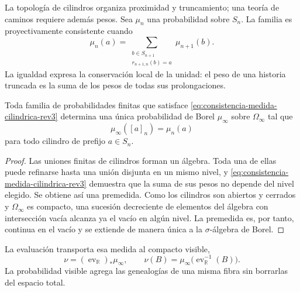 La topología de cilindros organiza proximidad y truncamiento; una teoría de
caminos requiere además pesos. Sea \(\mu_n\) una probabilidad sobre \(S_n\).
La familia es proyectivamente consistente cuando
\begin{equation}
 \mu_n(a)=
 \sum_{\substack{b\in S_{n+1}\\r_{n+1,n}(b)=a}}\mu_{n+1}(b).
 \label{eq:consistencia-medida-cilindrica-rev3}
\end{equation}
La igualdad expresa la conservación local de la unidad: el peso de una
historia truncada es la suma de los pesos de todas sus prolongaciones.

\begin{theorem}
\label{thm:medida-genealogica-limite-rev3}
Toda familia de probabilidades finitas que satisface
\eqref{eq:consistencia-medida-cilindrica-rev3} determina una única
probabilidad de Borel \(\mu_\infty\) sobre \(\Omega_\infty\) tal que
\begin{equation}
 \mu_\infty([a]_n)=\mu_n(a)
 \label{eq:medida-cilindro-rev3}
\end{equation}
para todo cilindro de prefijo \(a\in S_n\).
\end{theorem}

\begin{proof}
Las uniones finitas de cilindros forman un álgebra. Toda una de ellas puede
refinarse hasta una unión disjunta en un mismo nivel, y
\eqref{eq:consistencia-medida-cilindrica-rev3} demuestra que la suma de sus
pesos no depende del nivel elegido. Se obtiene así una premedida. Como los
cilindros son abiertos y cerrados y \(\Omega_\infty\) es compacto, una
sucesión decreciente de elementos del álgebra con intersección vacía alcanza
ya el vacío en algún nivel. La premedida es, por tanto, continua en el vacío
y se extiende de manera única a la \(\sigma\)-álgebra de Borel.
\end{proof}

La evaluación transporta esa medida al compacto visible,
\begin{equation}
 \nu=(\operatorname{ev}_{\mathbb R})_*\mu_\infty,
 \qquad
 \nu(B)=\mu_\infty\bigl(\operatorname{ev}_{\mathbb R}^{-1}(B)\bigr).
 \label{eq:pushforward-medida-visible-rev3}
\end{equation}
La probabilidad visible agrega las genealogías de una misma fibra sin
borrarlas del espacio total.

